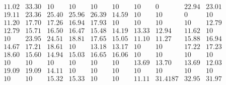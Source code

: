 \documentclass[12pt,oneside,a4paper]{article}
\begin{document}
\begin{equation}
  \tag{Mean Tabu Duration for each city (alpha = 1 and 100 cities)}
  \begin{smallmatrix} 11.02 & 33.30 & 10 & 10 & 10 & 10 & 10 & 0 & 22.94 & 23.01 \\
    19.11 & 23.36 & 25.40 & 25.96 & 26.39 & 14.59 & 10 & 10 & 0 & 10 \\
    11.20 & 17.70 & 17.26 & 16.94 & 17.93 & 10 & 10 & 10 & 10 & 12.79 \\
    12.79 & 15.71 & 16.50 & 16.47 & 15.48 & 14.19 & 13.33 & 12.94 & 11.62 & 10 \\
    10 & 23.95 & 24.51 & 18.81 & 17.65 & 15.05 & 11.10 & 11.27 & 15.88 & 16.94 \\
    14.67 & 17.21 & 18.61 & 10 & 13.18 & 13.17 & 10 & 10 & 17.22 & 17.23 \\
    18.60 & 15.60 & 14.94 & 15.03 & 16.65 & 16.06 & 10 & 10 & 10 & 10 \\
    10 & 10 & 10 & 10 & 10 & 10 & 13.69 & 13.70 & 13.69 & 12.03 \\
    19.09 & 19.09 & 14.11 & 10 & 10 & 10 & 10 & 10 & 10 & 10 \\
    10 & 10 & 15.32 & 15.33 & 10 & 10 & 11.11 & 31.4187 & 32.95 & 31.97 
  \end{smallmatrix}
\end{equation}
\end{document}
